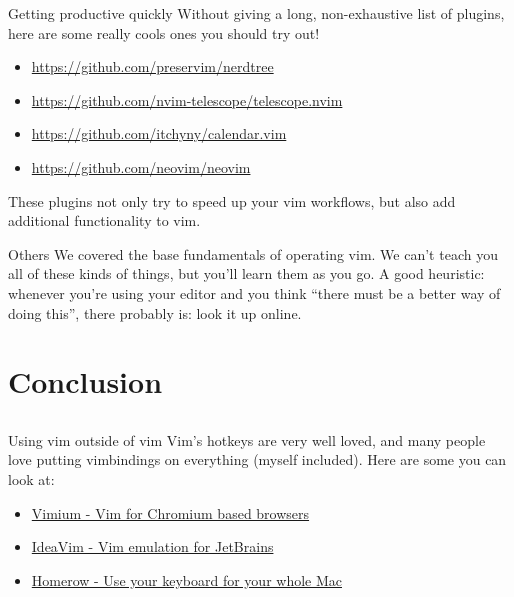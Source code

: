 \documentclass[12pt]{beamer}
\begin{document}
\begin{frame}{Getting productive quickly}
   Without giving a long, non-exhaustive list of plugins, here are some really cools ones you should try out!
   \begin{itemize}
       \item \url{https://github.com/preservim/nerdtree}
       \item \url{https://github.com/nvim-telescope/telescope.nvim}
       \item \url{https://github.com/itchyny/calendar.vim}
       \item \url{https://github.com/neovim/neovim}
   \end{itemize}
   These plugins not only try to speed up your vim workflows, but also add additional functionality to vim.
\end{frame}{}

\begin{frame}{Others}
    We covered the base fundamentals of operating vim. We can’t teach you all of these kinds of things, but you’ll learn them as you go. A good heuristic: whenever you’re using your editor and you think “there must be a better way of doing this”, there probably is: look it up online.
\end{frame}{}

\section{Conclusion}
\subsection{}


\begin{frame}{Using vim outside of vim}
    Vim's hotkeys are very well loved, and many people love putting vimbindings on everything (myself included).
    Here are some you can look at:

    \begin{itemize}
        \item \href{https://chrome.google.com/webstore/detail/vimium/dbepggeogbaibhgnhhndojpepiihcmeb?hl=en}{Vimium - Vim for Chromium based browsers}
        \item \href{https://plugins.jetbrains.com/plugin/164-ideavim}{IdeaVim - Vim emulation for JetBrains}
        \item \href{https://www.homerow.app}{Homerow - Use your keyboard for your whole Mac}
    \end{itemize}{}
\end{frame}{}
\end{document}
